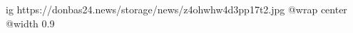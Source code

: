 
 
 
 
 

\ifcmt
  ig https://donbas24.news/storage/news/z4ohwhw4d3pp17t2.jpg
  @wrap center
  @width 0.9
\fi
